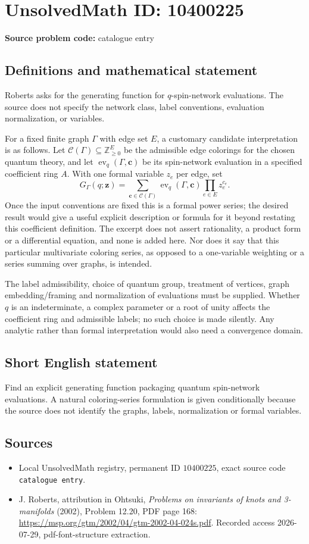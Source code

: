\documentclass[11pt]{article}
\newcommand{\Z}{\mathbb{Z}}
\begin{document}
\section*{UnsolvedMath ID: 10400225}
\textbf{Source problem code:} catalogue entry
\subsection{Definitions and mathematical statement}
Roberts asks for the generating function for \(q\)-spin-network evaluations. The source does not specify the network class, label conventions, evaluation normalization, or variables.

For a fixed finite graph \(\Gamma\) with edge set \(E\), a customary candidate interpretation is as follows. Let \(\mathcal C(\Gamma)\subseteq\Z_{\geq0}^{E}\) be the admissible edge colorings for the chosen quantum theory, and let \(\operatorname{ev}_q(\Gamma,\mathbf c)\) be its spin-network evaluation in a specified coefficient ring \(A\). With one formal variable \(z_e\) per edge, set
\[G_\Gamma(q;\mathbf z)=\sum_{\mathbf c\in\mathcal C(\Gamma)}\operatorname{ev}_q(\Gamma,\mathbf c)\prod_{e\in E}z_e^{c_e}.\]
Once the input conventions are fixed this is a formal power series; the desired result would give a useful explicit description or formula for it beyond restating this coefficient definition. The excerpt does not assert rationality, a product form or a differential equation, and none is added here. Nor does it say that this particular multivariate coloring series, as opposed to a one-variable weighting or a series summing over graphs, is intended.

The label admissibility, choice of quantum group, treatment of vertices, graph embedding/framing and normalization of evaluations must be supplied. Whether \(q\) is an indeterminate, a complex parameter or a root of unity affects the coefficient ring and admissible labels; no such choice is made silently. Any analytic rather than formal interpretation would also need a convergence domain.
\subsection{Short English statement}
Find an explicit generating function packaging quantum spin-network evaluations. A natural coloring-series formulation is given conditionally because the source does not identify the graphs, labels, normalization or formal variables.
\subsection{Sources}
\begin{itemize}
\item Local UnsolvedMath registry, permanent ID \(10400225\), exact source code \texttt{catalogue entry}.
\item J. Roberts, attribution in Ohtsuki, \emph{Problems on invariants of knots and 3-manifolds} (2002), Problem 12.20, PDF page 168: \url{https://msp.org/gtm/2002/04/gtm-2002-04-024s.pdf}. Recorded access 2026-07-29, pdf-font-structure extraction.
\end{itemize}
\end{document}
